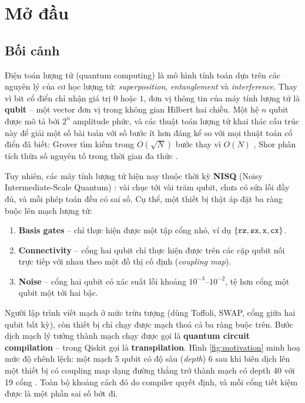 \section{Mở đầu}
\label{sec:intro}

\subsection{Bối cảnh}

Điện toán lượng tử (quantum computing) là mô hình tính toán dựa trên các nguyên lý của cơ học lượng
tử: \emph{superposition}, \emph{entanglement} và \emph{interference}. Thay vì bit cổ điển chỉ nhận
giá trị $0$ hoặc $1$, đơn vị thông tin của máy tính lượng tử là \textbf{qubit} -- một vector đơn vị
trong không gian Hilbert hai chiều. Một hệ $n$ qubit được mô tả bởi $2^n$ amplitude phức, và các
thuật toán lượng tử khai thác cấu trúc này để giải một số bài toán với số bước ít hơn đáng kể so với
mọi thuật toán cổ điển đã biết: Grover tìm kiếm trong $O(\sqrt{N})$ bước thay vì $O(N)$
\cite{grover1996}, Shor phân tích thừa số nguyên tố trong thời gian đa thức \cite{shor1997}.

Tuy nhiên, các máy tính lượng tử hiện nay thuộc thời kỳ \textbf{NISQ} (Noisy Intermediate-Scale
Quantum) \cite{preskill2018nisq}: vài chục tới vài trăm qubit, chưa có sửa lỗi đầy đủ, và mỗi phép
toán đều có sai số. Cụ thể, một thiết bị thật áp đặt ba ràng buộc lên mạch lượng tử:
\begin{enumerate}[noitemsep]
  \item \textbf{Basis gates} -- chỉ thực hiện được một tập cổng nhỏ, ví dụ
    $\{\texttt{rz}, \texttt{sx}, \texttt{x}, \texttt{cx}\}$.
  \item \textbf{Connectivity} -- cổng hai qubit chỉ thực hiện được trên các cặp qubit nối trực tiếp
    với nhau theo một đồ thị cố định (\emph{coupling map}).
  \item \textbf{Noise} -- cổng hai qubit có xác suất lỗi khoảng $10^{-3}$--$10^{-2}$, tệ hơn cổng
    một qubit một tới hai bậc.
\end{enumerate}

Người lập trình viết mạch ở mức trừu tượng (dùng Toffoli, SWAP, cổng giữa hai qubit bất kỳ), còn
thiết bị chỉ chạy được mạch thoả cả ba ràng buộc trên. Bước dịch mạch lý tưởng thành mạch chạy được
gọi là \textbf{quantum circuit compilation} -- trong Qiskit gọi là \textbf{transpilation}. Hình
\ref{fig:motivation} minh hoạ mức độ chênh lệch: một mạch 5 qubit có độ sâu (\emph{depth}) 6 sau khi
biên dịch lên một thiết bị có coupling map dạng đường thẳng trở thành mạch có depth 40 với 19 cổng
\cx{}. Toàn bộ khoảng cách đó do compiler quyết định, và mỗi cổng \cx{} tiết kiệm được là một phần
sai số bớt đi.

